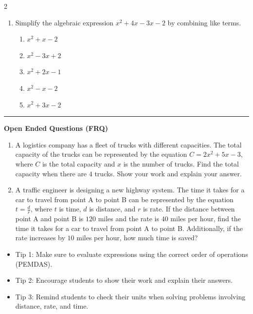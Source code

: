 \documentclass[10pt]{article}
\begin{document}
\begin{multicols}{2}
\begin{enumerate}[label=\textbf{Q\arabic*.}, leftmargin=*, itemsep=6pt, parsep=0pt]
  \item \small Simplify the algebraic expression $x^2 + 4x - 3x - 2$ by combining like terms.
  \begin{enumerate}[label=(\Alph*), leftmargin=0.6cm, nosep, itemsep=2pt]
    \item $x^2 + x - 2$
    \item $x^2 - 3x + 2$
    \item $x^2 + 2x - 1$
    \item $x^2 - x - 2$
    \item $x^2 + 3x - 2$
  \end{enumerate}

\end{enumerate}
\end{multicols}

\vspace{-0.2cm}
\hrule
\vspace{0.2cm}
\textbf{\small Open Ended Questions (FRQ)}
\begin{enumerate}[label=\textbf{Q\arabic*.}, start=9, itemsep=5pt, topsep=0pt]

  \item \small A logistics company has a fleet of trucks with different capacities. The total capacity of the trucks can be represented by the equation $C = 2x^2 + 5x - 3$, where $C$ is the total capacity and $x$ is the number of trucks. Find the total capacity when there are $4$ trucks. Show your work and explain your answer. \vspace{2cm}

  \item \small A traffic engineer is designing a new highway system. The time it takes for a car to travel from point A to point B can be represented by the equation $t = \frac{d}{r}$, where $t$ is time, $d$ is distance, and $r$ is rate. If the distance between point A and point B is $120$ miles and the rate is $40$ miles per hour, find the time it takes for a car to travel from point A to point B. Additionally, if the rate increases by $10$ miles per hour, how much time is saved? \vspace{2cm}

\end{enumerate}

\vfill

\begin{tcolorbox}[colback=blue!5, colframe=mainblue!50, title=\small \textbf{Chef's Tips}, fonttitle=\bfseries, bottom=1mm]
\begin{itemize}[noitemsep, topsep=2pt, leftmargin=0.5cm]
  \item \scriptsize Tip 1: Make sure to evaluate expressions using the correct order of operations (PEMDAS).\item \scriptsize Tip 2: Encourage students to show their work and explain their answers.\item \scriptsize Tip 3: Remind students to check their units when solving problems involving distance, rate, and time.
\end{itemize}
\end{tcolorbox}
\end{document}
